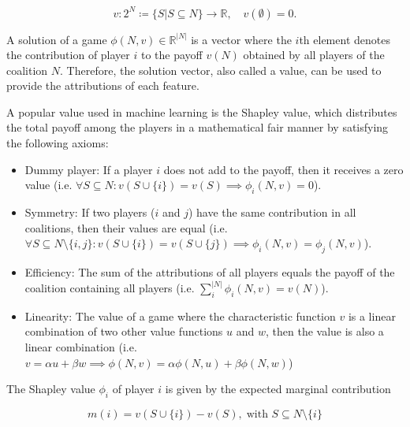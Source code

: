 \begin{equation}
	v: 2^N \coloneqq \{S | S \subseteq N\} \rightarrow \mathbb{R}, \quad v\left(\emptyset\right) = 0.
\end{equation}


A solution of a game $\phi(N, v) \in \mathbb{R}^{|N|}$ is a vector where the $i$th element
denotes the contribution of player $i$ to the payoff $v(N)$ obtained by all players
of the coalition $N$.\cite{zhang2022gstarx} Therefore, the solution vector,
also called a value, can be used to provide the attributions of each feature.


A popular value used in machine learning is the Shapley value, which distributes
the total payoff among the players in a mathematical fair manner by satisfying the
following axioms:\cite{merrick2020explanation, shapley1953value}


\begin{itemize}
	\item Dummy player: If a player $i$ does not add to the payoff, then it receives a
	      zero value (i.e. $\forall S \subseteq N: v(S \cup \{i\}) = v(S) \implies \phi_i(N, v) = 0$).

	\item Symmetry: If two players ($i$ and $j$) have the same contribution in all coalitions, then
	      their values are equal (i.e. $\forall S \subseteq N \setminus \{i, j\}: v(S \cup \{i\}) = v(S \cup \{j\}) \implies \phi_i(N, v) = \phi_j(N, v)$).

	\item Efficiency: The sum of the attributions of all players equals the payoff of the coalition containing
	      all players (i.e. $\sum^{|N|}_i \phi_i(N, v) = v(N)$).

	\item Linearity: The value of a game where the characteristic function $v$ is a linear combination of
	      two other value functions $u$ and $w$, then the value is also a linear combination (i.e.
	      $v = \alpha u + \beta w \implies \phi(N, v) = \alpha \phi(N, u) + \beta \phi(N, w)$)
\end{itemize}


The Shapley value $\phi_i$ of player $i$ is given by the expected marginal contribution\cite{zhang2022gstarx}


\begin{equation}
	m(i) = v\left(S \cup \{i\}\right) - v\left(S\right), \; \text{with } S \subseteq N \setminus \{i\}
\end{equation}


